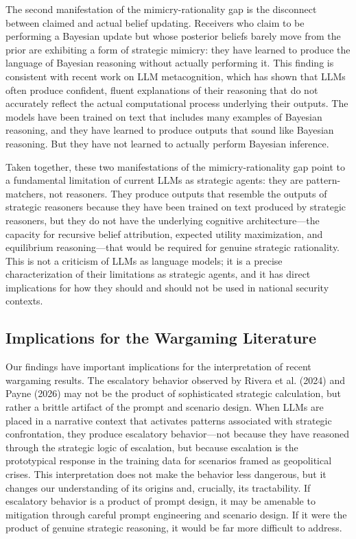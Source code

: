 \documentclass[12pt]{article}
\theoremstyle{plain}
\theoremstyle{definition}
\begin{document}
The second manifestation of the mimicry-rationality gap is the disconnect between claimed and actual belief updating. Receivers who claim to be performing a Bayesian update but whose posterior beliefs barely move from the prior are exhibiting a form of strategic mimicry: they have learned to produce the language of Bayesian reasoning without actually performing it. This finding is consistent with recent work on LLM metacognition, which has shown that LLMs often produce confident, fluent explanations of their reasoning that do not accurately reflect the actual computational process underlying their outputs. The models have been trained on text that includes many examples of Bayesian reasoning, and they have learned to produce outputs that sound like Bayesian reasoning. But they have not learned to actually perform Bayesian inference.

Taken together, these two manifestations of the mimicry-rationality gap point to a fundamental limitation of current LLMs as strategic agents: they are pattern-matchers, not reasoners. They produce outputs that resemble the outputs of strategic reasoners because they have been trained on text produced by strategic reasoners, but they do not have the underlying cognitive architecture---the capacity for recursive belief attribution, expected utility maximization, and equilibrium reasoning---that would be required for genuine strategic rationality. This is not a criticism of LLMs as language models; it is a precise characterization of their limitations as strategic agents, and it has direct implications for how they should and should not be used in national security contexts.

\subsection{Implications for the Wargaming Literature}

Our findings have important implications for the interpretation of recent wargaming results. The escalatory behavior observed by Rivera et al. (2024) and Payne (2026) may not be the product of sophisticated strategic calculation, but rather a brittle artifact of the prompt and scenario design. When LLMs are placed in a narrative context that activates patterns associated with strategic confrontation, they produce escalatory behavior---not because they have reasoned through the strategic logic of escalation, but because escalation is the prototypical response in the training data for scenarios framed as geopolitical crises. This interpretation does not make the behavior less dangerous, but it changes our understanding of its origins and, crucially, its tractability. If escalatory behavior is a product of prompt design, it may be amenable to mitigation through careful prompt engineering and scenario design. If it were the product of genuine strategic reasoning, it would be far more difficult to address.
\end{document}
